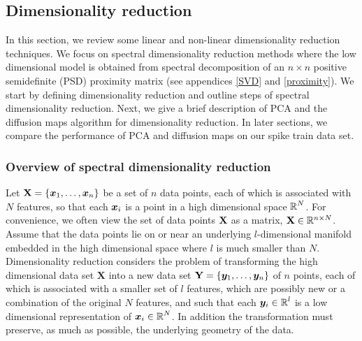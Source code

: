 
\subsection{Dimensionality reduction}\label{spectral decomp}
In this section, we review some linear and non-linear dimensionality reduction techniques. We focus on spectral dimensionality reduction methods where the low dimensional model is obtained from spectral decomposition of an $n \times n$ positive semidefinite (PSD) proximity matrix (see appendices \ref{SVD} and \ref{proximity}). We start by defining dimensionality reduction and outline steps of spectral dimensionality reduction. Next, we give a brief description of PCA and the diffusion maps algorithm for dimensionality reduction. In later sections, we compare the performance of PCA and diffusion maps on our spike train data set.


\subsubsection{Overview of spectral dimensionality reduction}
Let $\textbf{X} = \displaystyle \{\boldsymbol{x}_{1}, \ldots , \boldsymbol{x}_{n} \}$
be a set of $n$ data points, each of which is associated with $N$ features, so that each $\boldsymbol{x}_{i}$ is a point in a high dimensional space $\operatorname{\mathbb{R}}^{N}$. For convenience, we often view the set of data points $\textbf{X}$ as a matrix, $\textbf{X} \in \mathbb{R}^{n \times N}$.
Assume that the data points lie on or near an underlying $l$-dimensional manifold embedded in the high dimensional space where $l$ is much smaller than $N$. Dimensionality reduction considers the problem of  transforming the high dimensional data set $\textbf{X}$ into a new data set $\textbf{Y} = \displaystyle \{ \boldsymbol{y}_{1}, \ldots, \boldsymbol{y}_{n} \}$  of $n$ points, each of which is associated
with a smaller set of $l$ features, which are possibly new or a combination of the original $N$ features, and such that each $\boldsymbol{y}_{i} \in \operatorname{\mathbb{R}}^{l}$ is a low dimensional representation of $\boldsymbol{x}_{i} \in \operatorname{\mathbb{R}}^{N}$. In addition the transformation must preserve, as much as possible, the underlying geometry of the data.\\

